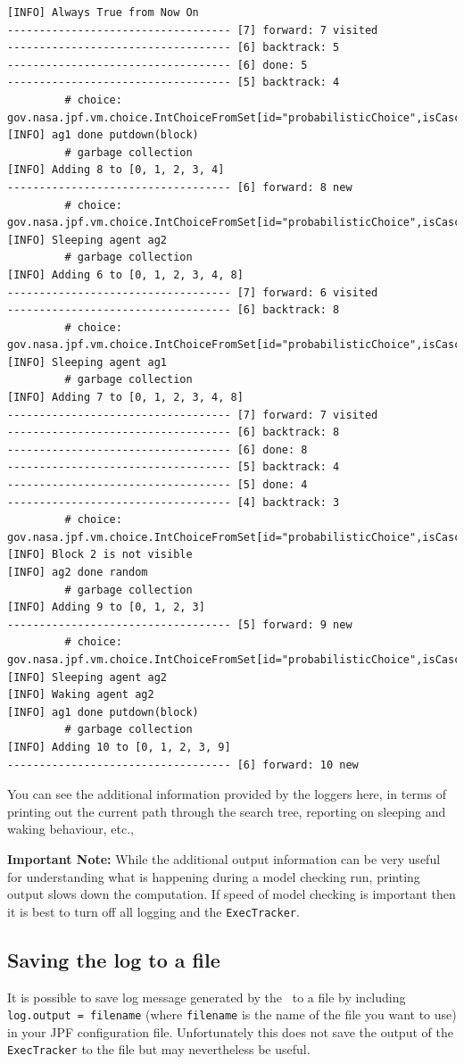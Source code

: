 \begin{verbatim}
[INFO] Always True from Now On
----------------------------------- [7] forward: 7 visited
----------------------------------- [6] backtrack: 5
----------------------------------- [6] done: 5
----------------------------------- [5] backtrack: 4
		 # choice: gov.nasa.jpf.vm.choice.IntChoiceFromSet[id="probabilisticChoice",isCascaded:false,0,>1]
[INFO] ag1 done putdown(block)
		 # garbage collection
[INFO] Adding 8 to [0, 1, 2, 3, 4]
----------------------------------- [6] forward: 8 new
		 # choice: gov.nasa.jpf.vm.choice.IntChoiceFromSet[id="probabilisticChoice",isCascaded:false,>0,1]
[INFO] Sleeping agent ag2
		 # garbage collection
[INFO] Adding 6 to [0, 1, 2, 3, 4, 8]
----------------------------------- [7] forward: 6 visited
----------------------------------- [6] backtrack: 8
		 # choice: gov.nasa.jpf.vm.choice.IntChoiceFromSet[id="probabilisticChoice",isCascaded:false,0,>1]
[INFO] Sleeping agent ag1
		 # garbage collection
[INFO] Adding 7 to [0, 1, 2, 3, 4, 8]
----------------------------------- [7] forward: 7 visited
----------------------------------- [6] backtrack: 8
----------------------------------- [6] done: 8
----------------------------------- [5] backtrack: 4
----------------------------------- [5] done: 4
----------------------------------- [4] backtrack: 3
		 # choice: gov.nasa.jpf.vm.choice.IntChoiceFromSet[id="probabilisticChoice",isCascaded:false,0,>1]
[INFO] Block 2 is not visible
[INFO] ag2 done random
		 # garbage collection
[INFO] Adding 9 to [0, 1, 2, 3]
----------------------------------- [5] forward: 9 new
		 # choice: gov.nasa.jpf.vm.choice.IntChoiceFromSet[id="probabilisticChoice",isCascaded:false,>0,1]
[INFO] Sleeping agent ag2
[INFO] Waking agent ag2
[INFO] ag1 done putdown(block)
		 # garbage collection
[INFO] Adding 10 to [0, 1, 2, 3, 9]
----------------------------------- [6] forward: 10 new
\end{verbatim}
You can see the additional information provided by the loggers here, in terms of printing out the current path through the search tree, reporting on sleeping and waking behaviour, etc.,

{\bf Important Note:} While the additional output information can be very useful for understanding what is happening during a model checking run, printing output slows down the computation.  If speed of model checking is important then it is best to turn off all logging and the \texttt{ExecTracker}.

\subsection{Saving the log to a file}
It is possible to save log message generated by the \ail\ to a file by including \texttt{log.output = filename} (where \texttt{filename} is the name of the file you want to use) in your JPF configuration file.  Unfortunately this does not save the output of the \texttt{ExecTracker} to the file but may nevertheless be useful.

